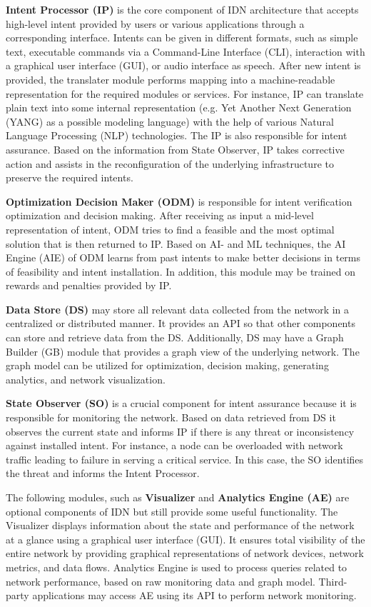 \textbf{Intent Processor (IP)} is the core component of IDN architecture that accepts high-level intent provided by users or various applications through a corresponding interface. Intents can be given in different formats, such as simple text, executable commands via a Command-Line Interface (CLI), interaction with a graphical user interface (GUI), or audio interface as speech. After new intent is provided, the translater module performs mapping into a machine-readable representation for the required modules or services. For instance, IP can translate plain text into some internal representation (e.g. Yet Another Next Generation (YANG) as a possible modeling language) with the help of various Natural Language Processing (NLP) technologies\cite[15]{Mehmood2021}. The IP is also responsible for intent assurance. Based on the information from State Observer, IP takes corrective action and assists in the reconfiguration of the underlying infrastructure to preserve the required intents.

\textbf{Optimization Decision Maker (ODM)} is responsible for intent verification optimization and decision making. After receiving as input a mid-level representation of intent, ODM tries to find a feasible and the most optimal solution that is then returned to IP. Based on AI- and ML techniques, the AI Engine (AIE) of ODM learns from past intents to make better decisions in terms of feasibility and intent installation. In addition, this module may be trained on rewards and penalties provided by IP.

\textbf{Data Store (DS)} may store all relevant data collected from the network in a centralized or distributed manner. It provides an API so that other components can store and retrieve data from the DS. Additionally, DS may have a Graph Builder (GB) module that provides a graph view of the underlying network. The graph model can be utilized for optimization, decision making, generating analytics, and network visualization.

\textbf{State Observer (SO)} is a crucial component for intent assurance because it is responsible for monitoring the network. Based on data retrieved from DS it observes the current state and informs IP if there is any threat or inconsistency against installed intent. For instance, a node can be overloaded with network traffic leading to failure in serving a critical service. In this case, the SO identifies the threat and informs the Intent Processor.

The following modules, such as \textbf{Visualizer} and \textbf{Analytics Engine (AE)} are optional components of IDN but still provide some useful functionality. The Visualizer displays information about the state and performance of the network at a glance using a graphical user interface (GUI). It ensures total visibility of the entire network by providing graphical representations of network devices, network metrics, and data flows. Analytics Engine is used to process queries related to network performance, based on raw monitoring data and graph model. Third-party applications may access AE using its API to perform network monitoring.

